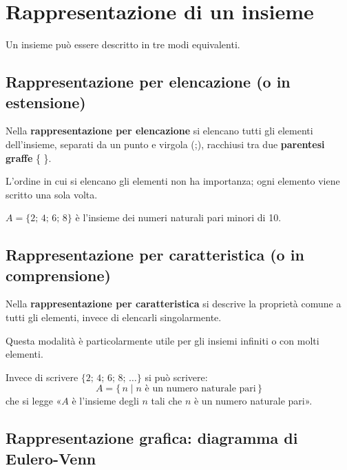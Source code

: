 \section{Rappresentazione di un insieme}

Un insieme può essere descritto in tre modi equivalenti.

\subsection{Rappresentazione per elencazione (o in estensione)}

\begin{regola}
Nella \textbf{rappresentazione per elencazione} si elencano tutti gli elementi dell'insieme, separati da un punto e virgola (;), racchiusi tra due \textbf{parentesi graffe} \{ \}.
\end{regola}

L'ordine in cui si elencano gli elementi non ha importanza; ogni elemento viene scritto una sola volta.

\begin{esempio}
$A = \{2;\, 4;\, 6;\, 8\}$ è l'insieme dei numeri naturali pari minori di 10.
\end{esempio}

\subsection{Rappresentazione per caratteristica (o in comprensione)}

\begin{regola}
Nella \textbf{rappresentazione per caratteristica} si descrive la proprietà comune a tutti gli elementi, invece di elencarli singolarmente.
\end{regola}

Questa modalità è particolarmente utile per gli insiemi infiniti o con molti elementi.

\begin{esempio}
Invece di scrivere $\{2;\, 4;\, 6;\, 8;\, \ldots\}$ si può scrivere:
\[
  A = \{\,n \mid n \text{ è un numero naturale pari}\,\}
\]
che si legge «$A$ è l'insieme degli $n$ tali che $n$ è un numero naturale pari».
\end{esempio}

\subsection{Rappresentazione grafica: diagramma di Eulero-Venn}

